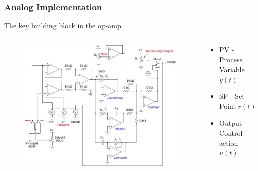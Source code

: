 \begin{frame}
	\frametitle{Analog Implementation}
	The key building block in the op-amp
	\begin{columns}
		\begin{column}{0.6\linewidth}
			\begin{figure}
				\centering
				\includegraphics[width=1.1\linewidth]{img/Principles_of_Feedback_Control_Fig_079}
			\end{figure}
		\end{column}
		\begin{column}{0.5\linewidth}
			\begin{itemize}
				\item PV - Process Variable $y(t)$
				\item SP - Set Point $r(t)$
				\item Output - Control action $u(t)$
			\end{itemize}
		\end{column}
	\end{columns}
\end{frame}

